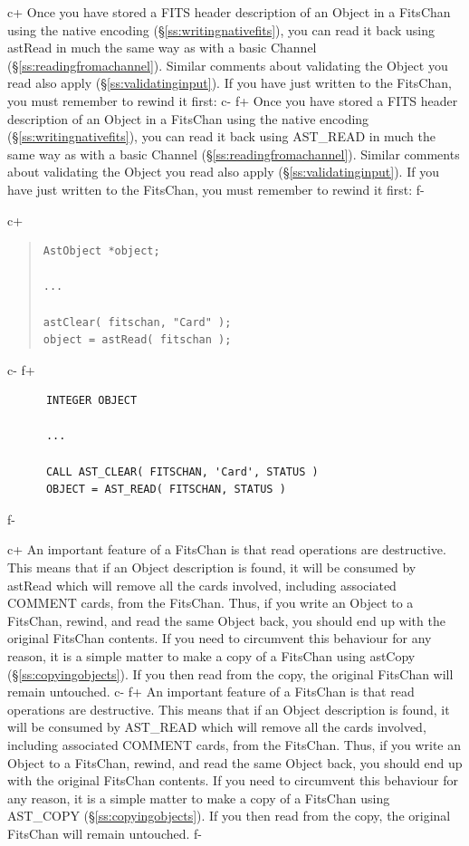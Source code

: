 \documentclass[twoside,11pt]{article}
\newcommand{\secref}[1]{\S\ref{#1}}
\newcommand{\secref}[1]{\ref{#1}}
\begin{document}
c+
Once you have stored a FITS header description of an Object in a
FitsChan using the native encoding (\secref{ss:writingnativefits}),
you can read it back using astRead in much the same way as with a
basic Channel (\secref{ss:readingfromachannel}). Similar comments
about validating the Object you read also apply
(\secref{ss:validatinginput}).  If you have just written to the
FitsChan, you must remember to rewind it first:
c-
f+
Once you have stored a FITS header description of an Object in a
FitsChan using the native encoding (\secref{ss:writingnativefits}),
you can read it back using AST\_READ in much the same way as with a
basic Channel (\secref{ss:readingfromachannel}). Similar comments
about validating the Object you read also apply
(\secref{ss:validatinginput}).  If you have just written to the
FitsChan, you must remember to rewind it first:
f-

c+
\begin{quote}
\small
\begin{verbatim}
AstObject *object;

...

astClear( fitschan, "Card" );
object = astRead( fitschan );
\end{verbatim}
\normalsize
\end{quote}
c-
f+
\small
\begin{verbatim}
      INTEGER OBJECT

      ...

      CALL AST_CLEAR( FITSCHAN, 'Card', STATUS )
      OBJECT = AST_READ( FITSCHAN, STATUS )
\end{verbatim}
\normalsize
f-

c+
An important feature of a FitsChan is that read operations are
destructive. This means that if an Object description is found, it
will be consumed by astRead which will remove all the cards involved,
including associated COMMENT cards, from the FitsChan. Thus, if you
write an Object to a FitsChan, rewind, and read the same Object back,
you should end up with the original FitsChan contents.  If you need to
circumvent this behaviour for any reason, it is a simple matter to
make a copy of a FitsChan using astCopy
(\secref{ss:copyingobjects}). If you then read from the copy, the
original FitsChan will remain untouched.
c-
f+
An important feature of a FitsChan is that read operations are
destructive. This means that if an Object description is found, it
will be consumed by AST\_READ which will remove all the cards
involved, including associated COMMENT cards, from the FitsChan. Thus,
if you write an Object to a FitsChan, rewind, and read the same Object
back, you should end up with the original FitsChan contents.  If you
need to circumvent this behaviour for any reason, it is a simple
matter to make a copy of a FitsChan using AST\_COPY
(\secref{ss:copyingobjects}). If you then read from the copy, the
original FitsChan will remain untouched.
f-
\end{document}

